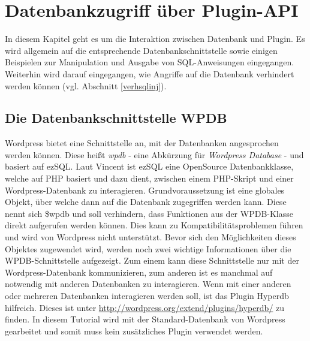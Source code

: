 \section{Datenbankzugriff über Plugin-API}\label{DBzugriff}
In diesem Kapitel geht es um die Interaktion zwischen Datenbank und Plugin. Es wird allgemein auf die entsprechende Datenbankschnittstelle sowie einigen Beispielen zur Manipulation und Ausgabe von SQL-Anweisungen eingegangen. Weiterhin wird darauf eingegangen, wie Angriffe auf die Datenbank verhindert werden können (vgl. Abschnitt \ref{verhsqlinj}).
\subsection{Die Datenbankschnittstelle WPDB}
Wordpress bietet eine Schnittstelle an, mit der Datenbanken angesprochen werden können. Diese heißt \emph{wpdb} - eine Abkürzung für \emph{Wordpress Database} - und basiert auf ezSQL. \newline
Laut Vincent ist ezSQL eine OpenSource Datenbankklasse, welche auf \gls{PHP} basiert und dazu dient, zwischen einem PHP-Skript und einer Wordpress-Datenbank zu interagieren.\newline
Grundvoraussetzung ist eine globales Objekt, über welche dann auf die Datenbank zugegriffen werden kann. Diese nennt sich \$wpdb und soll verhindern, dass Funktionen aus der WPDB-Klasse direkt aufgerufen werden können. Dies kann zu Kompatibilitätsproblemen führen und wird von Wordpress nicht unterstützt.\newline
Bevor sich den Möglichkeiten dieses Objektes zugewendet wird, werden noch zwei wichtige Informationen über die WPDB-Schnittstelle aufgezeigt. Zum einem kann diese Schnittstelle nur mit der Wordpress-Datenbank kommunizieren, zum anderen ist es manchmal auf notwendig mit anderen Datenbanken zu interagieren. \newline
Wenn mit einer anderen oder mehreren Datenbanken interagieren werden soll, ist das Plugin Hyperdb hilfreich. Dieses ist unter \url{http://wordpress.org/extend/plugins/hyperdb/} zu finden.\newline
In diesem Tutorial wird mit der Standard-Datenbank von Wordpress gearbeitet und somit muss kein zusätzliches Plugin verwendet werden. 
